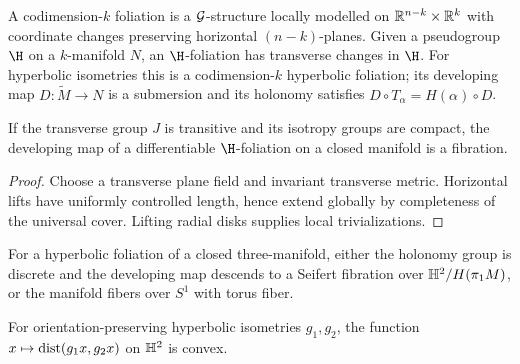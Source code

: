 \begin{definition}
\label{thurston-ch04-hyperbolic-foliation}
A codimension-\(k\) foliation is a \(\mathcal{G}\)-structure locally modelled on \(\mathbb{R}^{n-k}\times\mathbb{R}^k\) with coordinate changes preserving horizontal \((n-k)\)-planes. Given a pseudogroup \(\H\) on a \(k\)-manifold \(N\), an \(\H\)-foliation has transverse changes in \(\H\). For hyperbolic isometries this is a codimension-\(k\) hyperbolic foliation; its developing map \(D:\widetilde M\to N\) is a submersion and its holonomy satisfies \(D\circ T_\alpha=H(\alpha)\circ D\).

\end{definition}

\begin{proposition}
\label{thurston-ch04-foliation-developing-fibration}
If the transverse group \(J\) is transitive and its isotropy groups are compact, the developing map of a differentiable \(\H\)-foliation on a closed manifold is a fibration.

\end{proposition}

\begin{proof}
\sketch Choose a transverse plane field and invariant transverse metric. Horizontal lifts have uniformly controlled length, hence extend globally by completeness of the universal cover. Lifting radial disks supplies local trivializations.
\end{proof}

\begin{theorem}
\label{thurston-ch04-hyperbolic-foliation-classification}
For a hyperbolic foliation of a closed three-manifold, either the holonomy group is discrete and the developing map descends to a Seifert fibration over \(\mathbb{H}^2/H(\pi_1M)\), or the manifold fibers over \(S^1\) with torus fiber.

\end{theorem}

\begin{lemma}
\label{thurston-ch04-convex-displacement}
For orientation-preserving hyperbolic isometries \(g_1,g_2\), the function \(x\mapsto\operatorname{dist}(g_1x,g_2x)\) on \(\mathbb{H}^2\) is convex.

\end{lemma}

